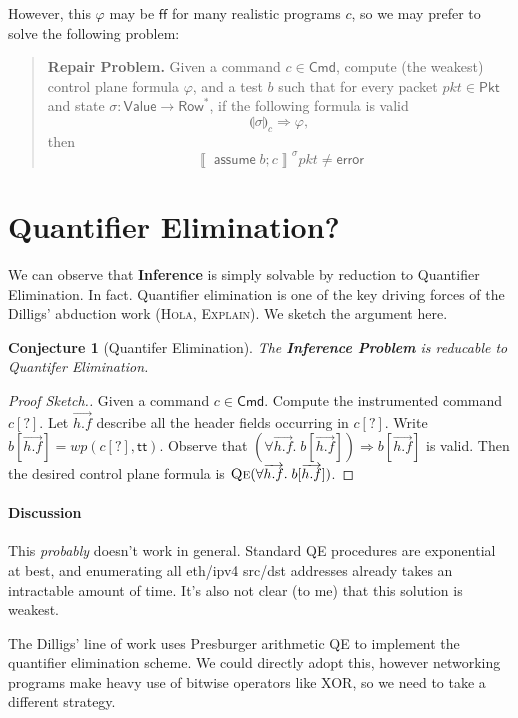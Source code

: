 \documentclass{article}
\newcommand{\pkt}{\mathit{pkt}}
\newcommand{\error}{\mathsf{error}}
\newcommand{\denote}[1]{\left\llbracket#1\right\rrbracket}
\newcommand{\TRUE}{\mathsf{tt}}
\newcommand{\FALSE}{\mathsf{ff}}
\newcommand{\Value}{\mathsf{Value}}
\newcommand{\Cmd}{\mathsf{Cmd}}
\newcommand{\Pkt}{\mathsf{Pkt}}
\newcommand{\Row}{\mathsf{Row}}
\newcommand{\assume}{\mathop{\mathsf{assume}}}
\newcommand{\WP}{\textit{wp}}
\newcommand{\state}[1]{\llparenthesis#1\rrparenthesis}
\newcommand{\instr}{[?]}
\newcommand{\qe}{\textsc{Qe}}
\newtheorem{conjecture}{Conjecture}
\begin{document}
However, this $\varphi$ may be $\FALSE$ for many realistic programs $c$, so we may
prefer to solve the following problem:

\begin{quote}
  \textbf{Repair Problem.} Given a command $c \in \Cmd$, compute (the weakest)
  control plane formula $\varphi$, and a test $b$ such that for every
  packet $\pkt \in \Pkt$ and state $\sigma : \Value \to \Row^*$, if the
  following formula is valid
  \[\state\sigma_c \Rightarrow \varphi,\]
  then \[\denote{\assume b; c}^\sigma\pkt \neq \error \]
\end{quote}

\section{Quantifier Elimination?}

We can observe that \textbf{Inference} is simply solvable by
reduction to Quantifier Elimination. In fact. Quantifier elimination is one of
the key driving forces of the Dilligs' abduction work (\textsc{Hola},
\textsc{Explain}). We sketch the argument here.

\begin{conjecture}[Quantifer Elimination]
  The \textbf{\textrm{Inference Problem}} is reducable to Quantifer Elimination.
\end{conjecture}

\begin{proof}[Proof Sketch.]
  Given a command $c \in \Cmd$. Compute the instrumented command $c\instr$. Let
  $\overrightarrow{h.f}$ describe all the header fields occurring in $c\instr$. Write
  $b[\overrightarrow{h.f}] = \WP(c\instr,\TRUE)$. Observe that $(\forall
  \overrightarrow{h.f}.\;b[\overrightarrow{h.f}]) \Rightarrow
  b[\overrightarrow{h.f}]$ is valid. Then the desired control plane formula is $\qe(\forall \overrightarrow{h.f}.\;b[\overrightarrow{h.f}])$.
\end{proof}

\paragraph{Discussion} This \emph{probably} doesn't work in general. Standard QE procedures are
exponential at best, and enumerating all eth/ipv4 src/dst addresses already
takes an intractable amount of time. It's also not clear (to me) that this
solution is weakest.

The Dilligs' line of work uses Presburger arithmetic QE to implement the
quantifier elimination scheme. We could directly adopt this, however networking
programs make heavy use of bitwise operators like XOR, so we need to take a
different strategy.
\end{document}

